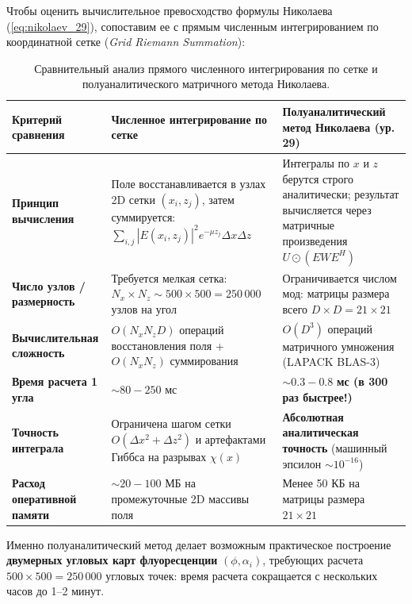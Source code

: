 \documentclass[a4paper,11pt]{article}
\begin{document}
Чтобы оценить вычислительное превосходство формулы Николаева (\ref{eq:nikolaev_29}), сопоставим ее с прямым численным интегрированием по координатной сетке (\textit{Grid Riemann Summation}):

\begin{table}[htbp]
\centering
\small
\begin{tabularx}{\textwidth}{p{4.2cm} X X}
\toprule
\textbf{Критерий сравнения} & \textbf{Численное интегрирование по сетке} & \textbf{Полуаналитический метод Николаева (ур. 29)} \\
\midrule
\textbf{Принцип вычисления} & Поле восстанавливается в узлах 2D сетки $(x_i, z_j)$, затем суммируется: $\sum_{i, j} |E(x_i, z_j)|^2 e^{-\mu z_j} \Delta x \Delta z$ & Интегралы по $x$ и $z$ берутся строго аналитически; результат вычисляется через матричные произведения $U \odot (E W E^H)$ \\
\addlinespace
\textbf{Число узлов / размерность} & Требуется мелкая сетка: $N_x \times N_z \sim 500 \times 500 = 250\,000$ узлов на угол & Ограничивается числом мод: матрицы размера всего $D \times D = 21 \times 21$ \\
\addlinespace
\textbf{Вычислительная сложность} & $O(N_x N_z D)$ операций восстановления поля + $O(N_x N_z)$ суммирования & $O(D^3)$ операций матричного умножения (LAPACK BLAS-3) \\
\addlinespace
\textbf{Время расчета 1 угла} & $\sim 80 - 250$ мс & $\mathbf{\sim 0.3 - 0.8}$ \textbf{мс (в 300 раз быстрее!)} \\
\addlinespace
\textbf{Точность интеграла} & Ограничена шагом сетки $O(\Delta x^2 + \Delta z^2)$ и артефактами Гиббса на разрывах $\chi(x)$ & \textbf{Абсолютная аналитическая точность} (машинный эпсилон $\sim 10^{-16}$) \\
\addlinespace
\textbf{Расход оперативной памяти} & $\sim 20 - 100$ МБ на промежуточные 2D массивы поля & Менее 50 КБ на матрицы размера $21 \times 21$ \\
\bottomrule
\end{tabularx}
\caption{Сравнительный анализ прямого численного интегрирования по сетке и полуаналитического матричного метода Николаева.}
\label{tab:grid_vs_semianalytic}
\end{table}

Именно полуаналитический метод делает возможным практическое построение \textbf{двумерных угловых карт флуоресценции} $(\phi, \alpha_i)$, требующих расчета $500 \times 500 = 250\,000$ угловых точек: время расчета сокращается с нескольких часов до 1–2 минут.
\end{document}
